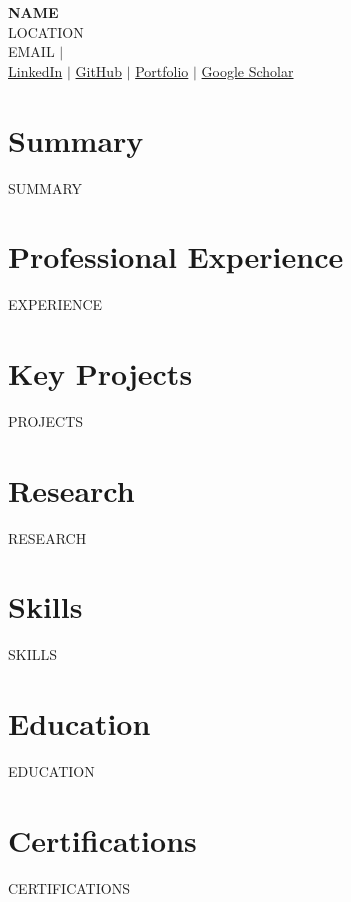 \documentclass[11pt,a4paper]{article}
\begin{document}
\begin{center}
    {\LARGE\bfseries {{NAME}}} \\[4pt]
    {{LOCATION}} \\[2pt]
    {{EMAIL}} \quad $\vert$  \\[2pt]
    \href{{{LINKEDIN}}}{LinkedIn} \quad $\vert$ \quad \href{{{GITHUB}}}{GitHub} \quad $\vert$ \quad \href{{{PORTFOLIO}}}{Portfolio} \quad $\vert$ \quad \href{{{GOOGLE_SCHOLAR}}}{Google Scholar}
\end{center}

\section{Summary}
{{SUMMARY}}

\section{Professional Experience}
{{EXPERIENCE}}

\section{Key Projects}
{{PROJECTS}}

\section{Research}
{{RESEARCH}}

\section{Skills}
{{SKILLS}}

\section{Education}
{{EDUCATION}}

\section{Certifications}
{{CERTIFICATIONS}}
\end{document}

